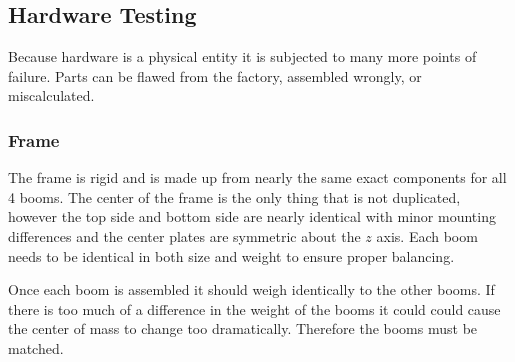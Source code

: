 \documentclass{article}
\numberwithin{equation}{section} %
\begin{document}



\subsection{Hardware Testing}
Because hardware is a physical entity it is subjected to many more points of failure. Parts can be flawed from the factory, assembled wrongly, or miscalculated.

\subsubsection{Frame}
The frame is rigid and is made up from nearly the same exact components for all 4 booms. The center of the frame is the only thing that is not duplicated, however the top side and bottom side are nearly identical with minor mounting differences and the center plates are symmetric about the $z$ axis. Each boom needs to be identical in both size and weight to ensure proper balancing.

Once each boom is assembled it should weigh identically to the other booms. If there is too much of a difference in the weight of the booms it could could cause the center of mass to change too dramatically. Therefore the booms must be matched.
\end{document}
